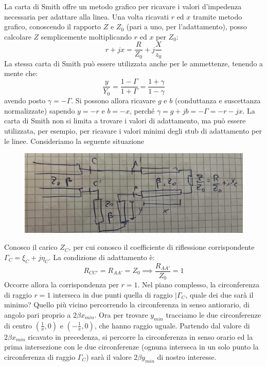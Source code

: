 \documentclass{book}
\begin{document}
        La carta di Smith offre un metodo grafico per ricavare i valori d'impedenza necessaria per adattare alla linea. Una volta
        ricavati $r$ ed $x$ tramite metodo grafico, conoscendo il rapporto $Z$ e $Z_{0}$ (pari a uno, per l'adattamento), posso calcolare $Z$ semplicemente
        moltiplicando $r$ ed $x$ per $Z_{0}$:
        \begin{equation}
            r+jx = \frac{R}{Z_{0}}+j\frac{X}{z_{0}}
        \end{equation}
        La stessa carta di Smith può essere utilizzata anche per le ammettenze, tenendo a mente che:
        \begin{equation}
            \frac{y}{Y_{0}} = \frac{1-\Gamma}{1+\Gamma} = \frac{1+\gamma}{1-\gamma}
        \end{equation}
        avendo posto $\gamma = -\Gamma$.
        Si possono allora ricavare $g$ e $b$ (conduttanza e suscettanza normalizzate) sapendo $y=-r$ e $b = -x$, 
        perché $\gamma = g+jb = -\Gamma = -r-jx$. \newpage 
        La carta di Smith non si limita a trovare i valori di adattamento, ma può essere utilizzata, per esempio, per ricavare 
        i valori minimi degli stub di adattamento per le linee. Consideriamo la seguente situazione
        \begin{figure}[h!]
            \center  
            \includegraphics[width=0.65\linewidth]{Chapter_two/chapt2img24}
        \end{figure}
        Conosco il carico $Z_{C}$, per cui conosco il coefficiente di riflessione corrispondente $\Gamma_{C} = \xi_{C}+j\eta_{C}$.
        La condizione di adattamento è:
        \begin{equation}
            R_{CC'}=R_{AA'} = Z_{0} \implies \frac{R_{AA'}}{Z_{0}} = 1
        \end{equation} 
        Occorre allora la corrispondenza per $r=1$. Nel piano complesso, la circonferenza di raggio $r=1$ interseca
        in due punti quella di raggio $|\Gamma_{C}$, quale dei due sarà il minimo? Quello più vicino percorrendo la circonferenza in senso 
        antiorario, di angolo pari proprio a $2\beta x_{min}$. Ora per trovare $y_{min}$ tracciamo le due circonferenze di centro $(\frac{1}{x},0)$ e
        $(-\frac{1}{x}, 0)$, che hanno raggio uguale. Partendo dal valore di $2\beta x_{min}$ ricavato in precedenza, si percorre la circonferenza in senso orario
        ed la prima intersezione con le due circonferenze (ognuna interseca in un solo punto la circonferenza di raggio $\Gamma_{C}$) sarà il valore 
        $2 \beta y_{min}$ di nostro interesse.
\end{document}
